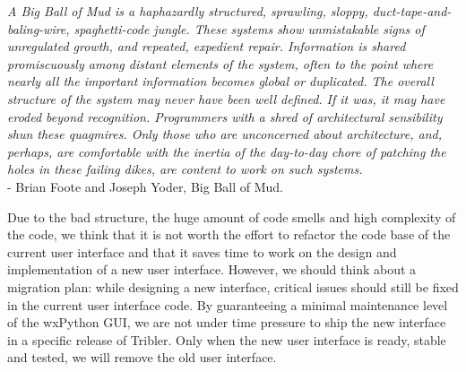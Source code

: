 \begin{displayquote}
	\emph{A Big Ball of Mud is a haphazardly structured, sprawling, sloppy, duct-tape-and-baling-wire, spaghetti-code jungle. These systems show unmistakable signs of unregulated growth, and repeated, expedient repair. Information is shared promiscuously among distant elements of the system, often to the point where nearly all the important information becomes global or duplicated. The overall structure of the system may never have been well defined. If it was, it may have eroded beyond recognition. Programmers with a shred of architectural sensibility shun these quagmires. Only those who are unconcerned about architecture, and, perhaps, are comfortable with the inertia of the day-to-day chore of patching the holes in these failing dikes, are content to work on such systems.}\\
	- Brian Foote and Joseph Yoder, Big Ball of Mud\cite{foote1997big}.
\end{displayquote}

\noindent Due to the bad structure, the huge amount of code smells and high complexity of the code, we think that it is not worth the effort to refactor the code base of the current user interface and that it saves time to work on the design and implementation of a new user interface. However, we should think about a migration plan: while designing a new interface, critical issues should still be fixed in the current user interface code. By guaranteeing a minimal maintenance level of the wxPython GUI, we are not under time pressure to ship the new interface in a specific release of Tribler. Only when the new user interface is ready, stable and tested, we will remove the old user interface.

